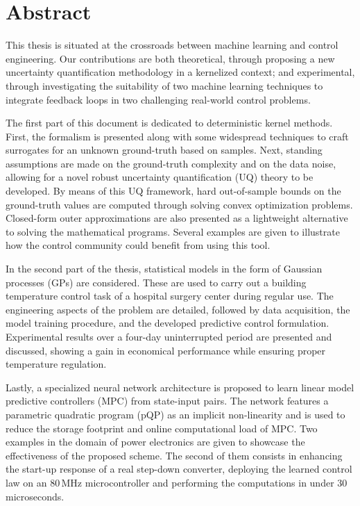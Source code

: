

\cleardoublepage
\chapter*{Abstract}
This thesis is situated at the crossroads between machine learning and control engineering. Our contributions are both theoretical, through proposing a new uncertainty quantification methodology in a kernelized context; and experimental, through investigating the suitability of two machine learning techniques to integrate feedback loops in two challenging real-world control problems.

The first part of this document is dedicated to deterministic kernel methods. First, the formalism is presented along with some widespread techniques to craft surrogates for an unknown ground-truth based on samples. Next, standing assumptions are made on the ground-truth complexity and on the data noise, allowing for a novel robust uncertainty quantification (UQ) theory to be developed. By means of this UQ framework, hard out-of-sample bounds on the ground-truth values are computed through solving convex optimization problems. Closed-form outer approximations are also presented as a lightweight alternative to solving the mathematical programs. Several examples are given to illustrate how the control community could benefit from using this tool.

In the second part of the thesis, statistical models in the form of Gaussian processes (GPs) are considered. These are used to carry out a building temperature control task of a hospital surgery center during regular use. The engineering aspects of the problem are detailed, followed by data acquisition, the model training procedure, and the developed predictive control formulation. Experimental results over a four-day uninterrupted period are presented and discussed, showing a gain in economical performance while ensuring proper temperature regulation. 

Lastly, a specialized neural network architecture is proposed to learn linear model predictive controllers (MPC) from state-input pairs. The network features a parametric quadratic program (pQP) as an implicit non-linearity and is used to reduce the storage footprint and online computational load of MPC. Two examples in the domain of power electronics are given to showcase the effectiveness of the proposed scheme. The second of them consists in enhancing the start-up response of a real step-down converter, deploying the learned control law on an 80$\,$MHz microcontroller and performing the computations in under $30\,$ microseconds.

